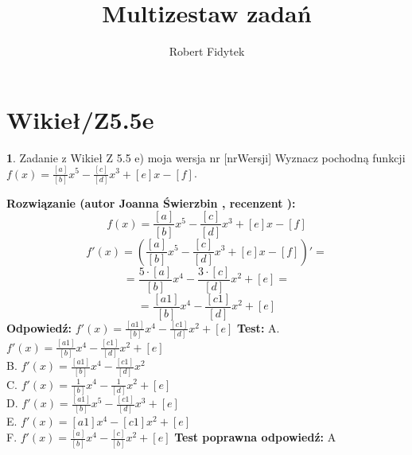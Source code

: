 \documentclass[12pt, a4paper]{article}
\title{Multizestaw zadań}
\author{Robert Fidytek}
\date{}
\theoremstyle{definition} %
\newtheorem{zad}{}
\newcommand{\kategoria}[1]{\section{#1}} %
\newcommand{\zadStart}[1]{\begin{zad}#1\newline} %
\newcommand{\zadStop}{\end{zad}}   %
\newcommand{\rozwStart}[2]{\noindent \textbf{Rozwiązanie (autor #1 , recenzent #2): }\newline} %
\newcommand{\rozwStop}{\newline}                                            %
\newcommand{\odpStart}{\noindent \textbf{Odpowiedź:}\newline}    %
\newcommand{\odpStop}{\newline}                                             %
\newcommand{\testStart}{\noindent \textbf{Test:}\newline} %
\newcommand{\testStop}{\newline} %
\newcommand{\kluczStart}{\noindent \textbf{Test poprawna odpowiedź:}\newline} %
\newcommand{\kluczStop}{\newline} %
\begin{document}
\maketitle


\kategoria{Wikieł/Z5.5e}
\zadStart{Zadanie z Wikieł Z 5.5 e) moja wersja nr [nrWersji]}
Wyznacz pochodną funkcji \\ $f(x)=\frac{[a]}{[b]}x^5-\frac{[c]}{[d]}x^3+[e]x-[f]$.
\zadStop
\rozwStart{Joanna Świerzbin}{}
$$f(x)=\frac{[a]}{[b]}x^5-\frac{[c]}{[d]}x^3+[e]x-[f]$$
$$f'(x)=\left(\frac{[a]}{[b]}x^5-\frac{[c]}{[d]}x^3+[e]x-[f]\right)' = $$
$$ = \frac{5\cdot[a]}{[b]}x^4-\frac{3\cdot[c]}{[d]}x^2+[e] = $$
$$ =  \frac{[a1]}{[b]}x^4-\frac{[c1]}{[d]}x^2+[e] $$
\rozwStop
\odpStart
$ f'(x) =  \frac{[a1]}{[b]}x^4-\frac{[c1]}{[d]}x^2+[e] $
\odpStop
\testStart
A. $ f'(x) =  \frac{[a1]}{[b]}x^4-\frac{[c1]}{[d]}x^2+[e] $\\
B. $ f'(x) =  \frac{[a1]}{[b]}x^4-\frac{[c1]}{[d]}x^2 $ \\
C. $ f'(x) =  \frac{1}{[b]}x^4-\frac{1}{[d]}x^2+[e] $ \\
D. $ f'(x) =  \frac{[a1]}{[b]}x^5-\frac{[c1]}{[d]}x^3+[e] $\\
E. $ f'(x) =  [a1]x^4-[c1]x^2+[e] $\\
F. $ f'(x) =  \frac{[a]}{[b]}x^4-\frac{[c]}{[b]}x^2+[e] $
\testStop
\kluczStart
A
\kluczStop
\end{document}
